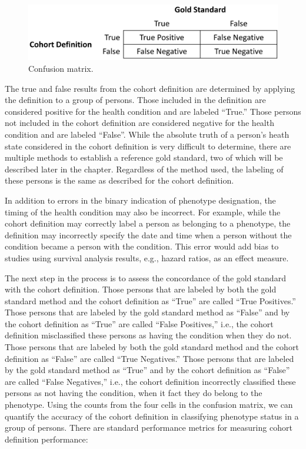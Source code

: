 \documentclass[11pt]{book}
\theoremstyle{definition}
\theoremstyle{definition}
\theoremstyle{definition}
\theoremstyle{remark}
\begin{document}
\begin{figure}

{\centering \includegraphics[width=0.75\linewidth]{images/ClinicalValidity/matrix} 

}

\caption{Confusion matrix.}\label{fig:matrix}
\end{figure}

The true and false results from the cohort definition are determined by
applying the definition to a group of persons. Those included in the
definition are considered positive for the health condition and are
labeled ``True.'' Those persons not included in the cohort definition
are considered negative for the health condition and are labeled
``False''. While the absolute truth of a person's heath state considered
in the cohort definition is very difficult to determine, there are
multiple methods to establish a reference gold standard, two of which
will be described later in the chapter. Regardless of the method used,
the labeling of these persons is the same as described for the cohort
definition.

In addition to errors in the binary indication of phenotype designation,
the timing of the health condition may also be incorrect. For example,
while the cohort definition may correctly label a person as belonging to
a phenotype, the definition may incorrectly specify the date and time
when a person without the condition became a person with the condition.
This error would add bias to studies using survival analysis results,
e.g., hazard ratios, as an effect measure.

The next step in the process is to assess the concordance of the gold
standard with the cohort definition. Those persons that are labeled by
both the gold standard method and the cohort definition as ``True'' are
called ``True Positives.'' Those persons that are labeled by the gold
standard method as ``False'' and by the cohort definition as ``True''
are called ``False Positives,'' i.e., the cohort definition
misclassified these persons as having the condition when they do not.
Those persons that are labeled by both the gold standard method and the
cohort definition as ``False'' are called ``True Negatives.'' Those
persons that are labeled by the gold standard method as ``True'' and by
the cohort definition as ``False'' are called ``False Negatives,'' i.e.,
the cohort definition incorrectly classified these persons as not having
the condition, when it fact they do belong to the phenotype. Using the
counts from the four cells in the confusion matrix, we can quantify the
accuracy of the cohort definition in classifying phenotype status in a
group of persons. There are standard performance metrics for measuring
cohort definition performance:
\end{document}
